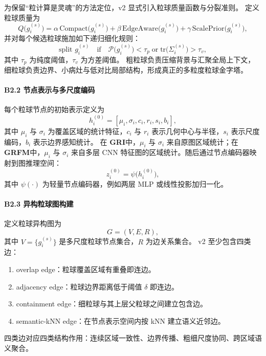 \documentclass[UTF8,a4paper]{ctexart}
\newcommand{\gri}{\textbf{GRI}}
\newcommand{\grfm}{\textbf{GRFM}}
\begin{document}
为保留“粒计算是灵魂”的方法定位，v2 显式引入粒球质量函数与分裂准则。
定义粒球质量为
\begin{equation}
  Q\big(g_i^{(s)}\big)=
  \alpha\,\mathrm{Compact}\big(g_i^{(s)}\big)
  +\beta\,\mathrm{EdgeAware}\big(g_i^{(s)}\big)
  +\gamma\,\mathrm{ScalePrior}\big(g_i^{(s)}\big),
\end{equation}
并对每个候选粒球施加如下递归细化规则：
\begin{equation}
  \text{split } g_i^{(s)}
  \quad \text{if}\quad
  \mathcal{P}\big(g_i^{(s)}\big)<\tau_p
  \;\text{or}\;
  \mathrm{tr}\big(\Sigma_i^{(s)}\big)>\tau_v,
\end{equation}
其中 $\tau_p$ 为纯度阈值，$\tau_v$ 为方差阈值。
粗粒球负责压缩背景与汇聚全局上下文，细粒球负责边界、小病灶与低对比局部结构，形成真正的多粒度粒球金字塔。

\paragraph{B2.2 节点表示与多尺度编码}
每个粒球节点的初始表示定义为
\begin{equation}
  h_i^{(0)}=[\mu_i,\sigma_i,c_i,r_i,s_i,b_i],
\end{equation}
其中 $\mu_i$ 与 $\sigma_i$ 为覆盖区域的统计特征，$c_i$ 与 $r_i$ 表示几何中心与半径，$s_i$ 表示尺度编码，$b_i$ 表示边界感知统计。
在 \gri 中，$\mu_i$ 与 $\sigma_i$ 来自原图区域统计；在 \grfm 中，$\mu_i$ 与 $\sigma_i$ 来自多层 CNN 特征图的区域统计。随后通过节点编码器映射到图推理空间：
\begin{equation}
  z_i^{(0)}=\psi\big(h_i^{(0)}\big),
\end{equation}
其中 $\psi(\cdot)$ 为轻量节点编码器，例如两层 MLP 或线性投影加归一化。

\paragraph{B2.3 异构粒球图构建}
定义粒球异构图为
\begin{equation}
  G=(V,E,R),
\end{equation}
其中 $V=\{g_i^{(s)}\}$ 是多尺度粒球节点集合，$R$ 为边关系集合。
v2 至少包含四类边：
\begin{enumerate}
  \item overlap edge：粒球覆盖区域有重叠即连边。
  \item adjacency edge：粒球边界距离低于阈值 $\delta$ 即连边。
  \item containment edge：细粒球与其上层父粒球之间建立包含边。
  \item semantic-kNN edge：在节点表示空间内按 kNN 建立语义近邻边。
\end{enumerate}
四类边对应四类结构作用：连续区域一致性、边界传播、粗细尺度协同、跨区域语义聚合。
\end{document}
